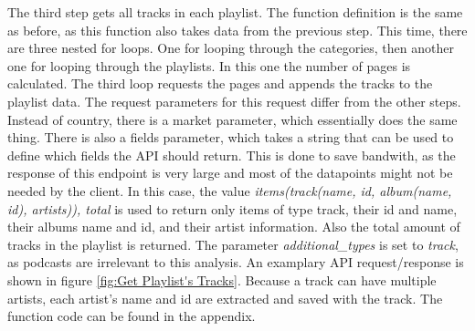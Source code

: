 The third step gets all tracks in each playlist. The function definition is the same as before, as this function also
takes data from the previous step. This time, there are three nested for loops. One for looping through the categories,
then another one for looping through the playlists. In this one the number of pages is calculated.
The third loop requests the pages and appends the tracks to the playlist data.
The request parameters for this request differ from the other steps.
Instead of country, there is a market parameter, which essentially does the same thing.
There is also a fields parameter, which takes a string that can be used to define which fields the API should
return. This is done to save bandwith, as the response of this endpoint is very large and most
of the datapoints might not be needed by the client.
In this case, the value \emph{items(track(name, id, album(name, id), artists)), total} is used to return only
items of type track, their id and name, their albums name and id, and their artist information.
Also the total amount of tracks in the playlist is returned.
The parameter \emph{additional\_types} is set to \emph{track}, as podcasts are irrelevant to this analysis.
An examplary API request/response is shown in figure \ref{fig:Get Playlist's Tracks}.
Because a track can have multiple artists, each artist's name and id are extracted and saved with the track.
The function code can be found in the appendix.

